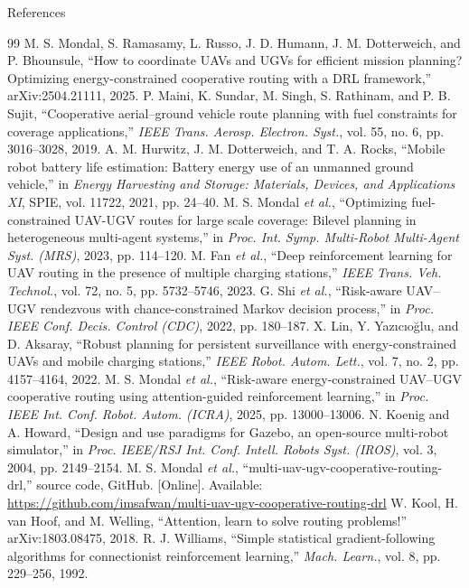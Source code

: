 \documentclass[aspectratio=169,10pt]{beamer}
\begin{document}
\begin{frame}{References}
\fontsize{5.7}{6.7}\selectfont\setlength{\itemsep}{0.5pt}
\begin{thebibliography}{99}
 M. S. Mondal, S. Ramasamy, L. Russo, J. D. Humann, J. M. Dotterweich, and P. Bhounsule, ``How to coordinate UAVs and UGVs for efficient mission planning? Optimizing energy-constrained cooperative routing with a DRL framework,'' arXiv:2504.21111, 2025.
 P. Maini, K. Sundar, M. Singh, S. Rathinam, and P. B. Sujit, ``Cooperative aerial--ground vehicle route planning with fuel constraints for coverage applications,'' \emph{IEEE Trans. Aerosp. Electron. Syst.}, vol. 55, no. 6, pp. 3016--3028, 2019.
 A. M. Hurwitz, J. M. Dotterweich, and T. A. Rocks, ``Mobile robot battery life estimation: Battery energy use of an unmanned ground vehicle,'' in \emph{Energy Harvesting and Storage: Materials, Devices, and Applications XI}, SPIE, vol. 11722, 2021, pp. 24--40.
 M. S. Mondal \emph{et al.}, ``Optimizing fuel-constrained UAV-UGV routes for large scale coverage: Bilevel planning in heterogeneous multi-agent systems,'' in \emph{Proc. Int. Symp. Multi-Robot Multi-Agent Syst. (MRS)}, 2023, pp. 114--120.
 M. Fan \emph{et al.}, ``Deep reinforcement learning for UAV routing in the presence of multiple charging stations,'' \emph{IEEE Trans. Veh. Technol.}, vol. 72, no. 5, pp. 5732--5746, 2023.
 G. Shi \emph{et al.}, ``Risk-aware UAV--UGV rendezvous with chance-constrained Markov decision process,'' in \emph{Proc. IEEE Conf. Decis. Control (CDC)}, 2022, pp. 180--187.
 X. Lin, Y. Yaz{\i}c{\i}o\u{g}lu, and D. Aksaray, ``Robust planning for persistent surveillance with energy-constrained UAVs and mobile charging stations,'' \emph{IEEE Robot. Autom. Lett.}, vol. 7, no. 2, pp. 4157--4164, 2022.
 M. S. Mondal \emph{et al.}, ``Risk-aware energy-constrained UAV--UGV cooperative routing using attention-guided reinforcement learning,'' in \emph{Proc. IEEE Int. Conf. Robot. Autom. (ICRA)}, 2025, pp. 13000--13006.
 N. Koenig and A. Howard, ``Design and use paradigms for Gazebo, an open-source multi-robot simulator,'' in \emph{Proc. IEEE/RSJ Int. Conf. Intell. Robots Syst. (IROS)}, vol. 3, 2004, pp. 2149--2154.
 M. S. Mondal \emph{et al.}, ``multi-uav-ugv-cooperative-routing-drl,'' source code, GitHub. [Online]. Available: \url{https://github.com/imsafwan/multi-uav-ugv-cooperative-routing-drl}
 W. Kool, H. van Hoof, and M. Welling, ``Attention, learn to solve routing problems!'' arXiv:1803.08475, 2018.
 R. J. Williams, ``Simple statistical gradient-following algorithms for connectionist reinforcement learning,'' \emph{Mach. Learn.}, vol. 8, pp. 229--256, 1992.
\end{thebibliography}
\end{frame}
\end{document}
